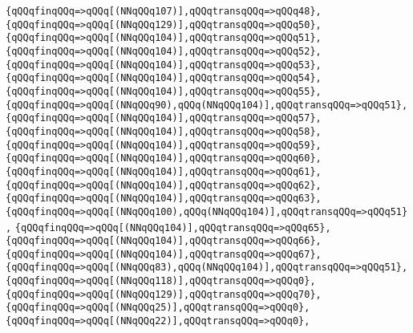 \verb|{qQQqfinqQQq=>qQQq[(NNqQQq107)],qQQqtransqQQq=>qQQq48},|\newline
\verb|{qQQqfinqQQq=>qQQq[(NNqQQq129)],qQQqtransqQQq=>qQQq50},|\newline
\verb|{qQQqfinqQQq=>qQQq[(NNqQQq104)],qQQqtransqQQq=>qQQq51},|\newline
\verb|{qQQqfinqQQq=>qQQq[(NNqQQq104)],qQQqtransqQQq=>qQQq52},|\newline
\verb|{qQQqfinqQQq=>qQQq[(NNqQQq104)],qQQqtransqQQq=>qQQq53},|\newline
\verb|{qQQqfinqQQq=>qQQq[(NNqQQq104)],qQQqtransqQQq=>qQQq54},|\newline
\verb|{qQQqfinqQQq=>qQQq[(NNqQQq104)],qQQqtransqQQq=>qQQq55},|\newline
\verb|{qQQqfinqQQq=>qQQq[(NNqQQq90),qQQq(NNqQQq104)],qQQqtransqQQq=>qQQq51},|\newline
\verb|{qQQqfinqQQq=>qQQq[(NNqQQq104)],qQQqtransqQQq=>qQQq57},|\newline
\verb|{qQQqfinqQQq=>qQQq[(NNqQQq104)],qQQqtransqQQq=>qQQq58},|\newline
\verb|{qQQqfinqQQq=>qQQq[(NNqQQq104)],qQQqtransqQQq=>qQQq59},|\newline
\verb|{qQQqfinqQQq=>qQQq[(NNqQQq104)],qQQqtransqQQq=>qQQq60},|\newline
\verb|{qQQqfinqQQq=>qQQq[(NNqQQq104)],qQQqtransqQQq=>qQQq61},|\newline
\verb|{qQQqfinqQQq=>qQQq[(NNqQQq104)],qQQqtransqQQq=>qQQq62},|\newline
\verb|{qQQqfinqQQq=>qQQq[(NNqQQq104)],qQQqtransqQQq=>qQQq63},|\newline
\verb|{qQQqfinqQQq=>qQQq[(NNqQQq100),qQQq(NNqQQq104)],qQQqtransqQQq=>qQQq51},|\newline
\verb|{qQQqfinqQQq=>qQQq[(NNqQQq104)],qQQqtransqQQq=>qQQq65},|\newline
\verb|{qQQqfinqQQq=>qQQq[(NNqQQq104)],qQQqtransqQQq=>qQQq66},|\newline
\verb|{qQQqfinqQQq=>qQQq[(NNqQQq104)],qQQqtransqQQq=>qQQq67},|\newline
\verb|{qQQqfinqQQq=>qQQq[(NNqQQq83),qQQq(NNqQQq104)],qQQqtransqQQq=>qQQq51},|\newline
\verb|{qQQqfinqQQq=>qQQq[(NNqQQq118)],qQQqtransqQQq=>qQQq0},|\newline
\verb|{qQQqfinqQQq=>qQQq[(NNqQQq129)],qQQqtransqQQq=>qQQq70},|\newline
\verb|{qQQqfinqQQq=>qQQq[(NNqQQq25)],qQQqtransqQQq=>qQQq0},|\newline
\verb|{qQQqfinqQQq=>qQQq[(NNqQQq22)],qQQqtransqQQq=>qQQq0},|\newline
